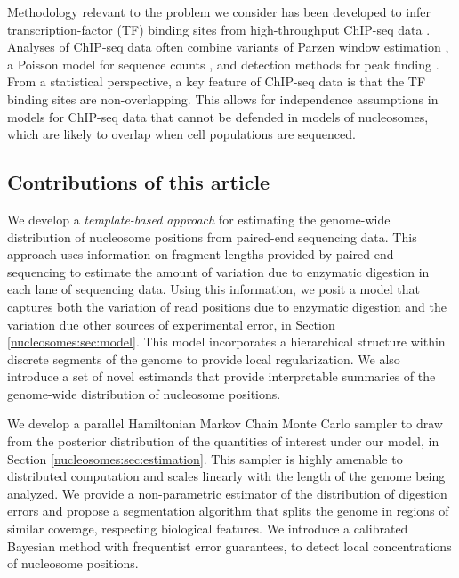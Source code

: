 Methodology relevant to the problem we consider has been developed to infer transcription-factor (TF) binding sites from high-throughput ChIP-seq data \citep{park:2009}.
Analyses of ChIP-seq data often combine variants of Parzen window estimation \citep{Schwartzman2011a}, a Poisson model for sequence counts \citep{Zhang2008}, and detection methods for peak finding \citep{Pepke2009}.
%
From a statistical perspective, a key feature of ChIP-seq data is that the TF binding sites are non-overlapping.
This allows for independence assumptions in models for ChIP-seq data \citep{bars:zhao:2009} that cannot be defended in models of nucleosomes, which are likely to overlap when cell populations are sequenced.


\subsection{Contributions of this article}


We develop a {\em template-based approach} for estimating the genome-wide distribution of nucleosome positions from paired-end sequencing data.
This approach uses information on fragment lengths provided by paired-end sequencing to estimate the amount of variation due to enzymatic digestion in each lane of sequencing data.
Using this information, we posit a model that captures both the variation of read positions due to enzymatic digestion and the variation due other sources of experimental error, in Section \ref{nucleosomes:sec:model}.
This model incorporates a hierarchical structure within discrete segments of the genome to provide local regularization.
We also introduce a set of novel estimands that provide interpretable summaries of the genome-wide distribution of nucleosome positions.

We develop a parallel Hamiltonian Markov Chain Monte Carlo sampler to draw from the posterior distribution of the quantities of interest under our model, in Section \ref{nucleosomes:sec:estimation}.
This sampler is highly amenable to distributed computation and scales  linearly with the length of the genome being analyzed.
We provide a non-parametric estimator of the distribution of digestion errors and propose a segmentation algorithm that splits the genome in regions of similar coverage, respecting biological features.
We introduce a calibrated Bayesian method with frequentist error guarantees, to detect local concentrations of nucleosome positions.

